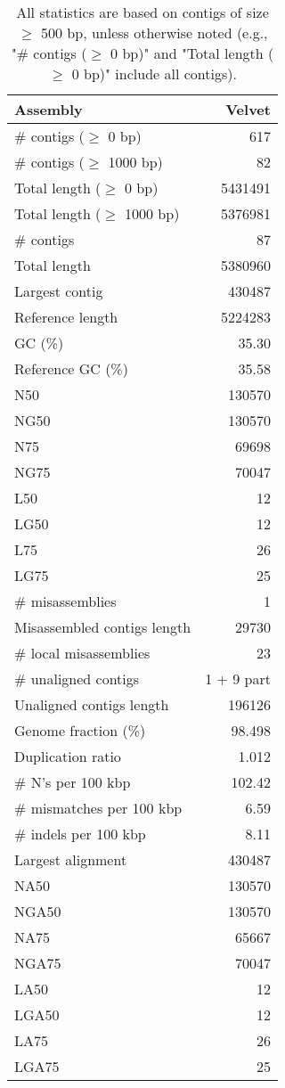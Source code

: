 \documentclass[12pt,a4paper]{article}
\begin{document}
\begin{table}[ht]
\begin{center}
\caption{All statistics are based on contigs of size $\geq$ 500 bp, unless otherwise noted (e.g., "\# contigs ($\geq$ 0 bp)" and "Total length ($\geq$ 0 bp)" include all contigs).}
\begin{tabular}{|l*{1}{|r}|}
\hline
Assembly & Velvet \\ \hline
\# contigs ($\geq$ 0 bp) & 617 \\ \hline
\# contigs ($\geq$ 1000 bp) & 82 \\ \hline
Total length ($\geq$ 0 bp) & 5431491 \\ \hline
Total length ($\geq$ 1000 bp) & 5376981 \\ \hline
\# contigs & 87 \\ \hline
Total length & 5380960 \\ \hline
Largest contig & 430487 \\ \hline
Reference length & 5224283 \\ \hline
GC (\%) & 35.30 \\ \hline
Reference GC (\%) & 35.58 \\ \hline
N50 & 130570 \\ \hline
NG50 & 130570 \\ \hline
N75 & 69698 \\ \hline
NG75 & 70047 \\ \hline
L50 & 12 \\ \hline
LG50 & 12 \\ \hline
L75 & 26 \\ \hline
LG75 & 25 \\ \hline
\# misassemblies & 1 \\ \hline
Misassembled contigs length & 29730 \\ \hline
\# local misassemblies & 23 \\ \hline
\# unaligned contigs & 1 + 9 part \\ \hline
Unaligned contigs length & 196126 \\ \hline
Genome fraction (\%) & 98.498 \\ \hline
Duplication ratio & 1.012 \\ \hline
\# N's per 100 kbp & 102.42 \\ \hline
\# mismatches per 100 kbp & 6.59 \\ \hline
\# indels per 100 kbp & 8.11 \\ \hline
Largest alignment & 430487 \\ \hline
NA50 & 130570 \\ \hline
NGA50 & 130570 \\ \hline
NA75 & 65667 \\ \hline
NGA75 & 70047 \\ \hline
LA50 & 12 \\ \hline
LGA50 & 12 \\ \hline
LA75 & 26 \\ \hline
LGA75 & 25 \\ \hline
\end{tabular}
\end{center}
\end{table}
\end{document}
